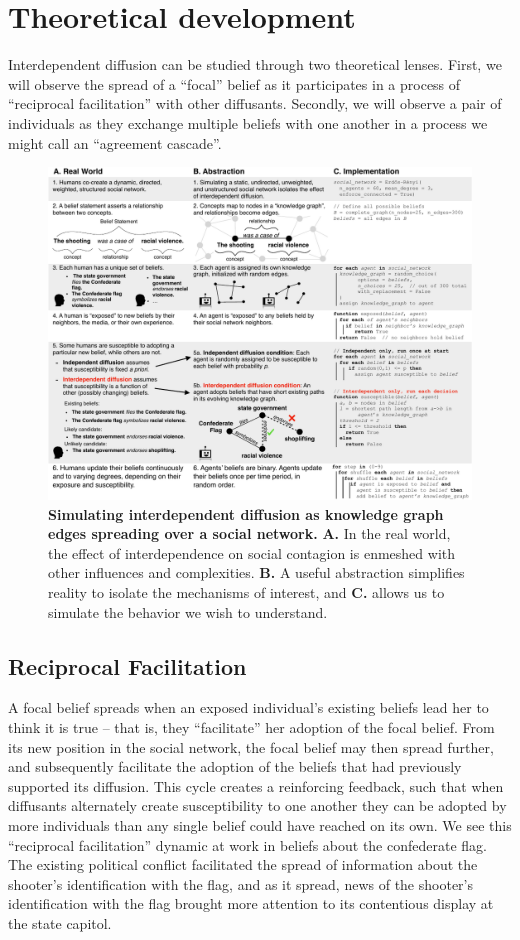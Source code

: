 \documentclass[9pt,twocolumn,twoside,lineno]{pnas-new}
\begin{document}
\section*{Theoretical development}
Interdependent diffusion can be studied through two theoretical lenses. First, we will observe the spread of a ``focal'' belief as it participates in a process of ``reciprocal facilitation'' with other diffusants. Secondly, we will observe a pair of individuals as they exchange multiple beliefs with one another in a process we might call an ``agreement cascade''.

\begin{figure}[ht]
    \includegraphics[width=7in]{Fig1.pdf}
    \caption{\textbf{Simulating interdependent diffusion as knowledge graph edges spreading over a social network.} \textbf{A.} In the real world, the effect of interdependence on social contagion is enmeshed with other influences and complexities.  \textbf{B.} A useful abstraction simplifies reality to isolate the mechanisms of interest, and \textbf{C.} allows us to simulate the behavior we wish to understand.}
    \label{fig:model}
\end{figure}

\subsection*{Reciprocal Facilitation}
A focal belief spreads when an exposed individual’s existing beliefs lead her to think it is true – that is, they ``facilitate'' her adoption of the focal belief. From its new position in the social network, the focal belief may then spread further, and subsequently facilitate the adoption of the beliefs that had previously supported its diffusion. This cycle creates a reinforcing feedback, such that when diffusants alternately create susceptibility to one another they can be adopted by more individuals than any single belief could have reached on its own. We see this ``reciprocal facilitation'' dynamic at work in beliefs about the confederate flag. The existing political conflict facilitated the spread of information about the shooter’s identification with the flag, and as it spread, news of the shooter’s identification with the flag brought more attention to its contentious display at the state capitol. 
\end{document}
